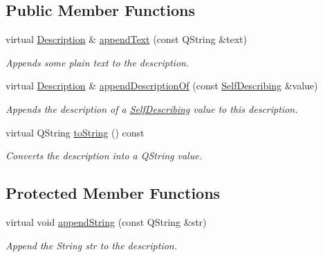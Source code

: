 \subsection*{Public Member Functions}
\begin{DoxyCompactItemize}
\item 
\hypertarget{class_hamcrest_qt_1_1_base_description_a31de838e1dc68a94d60488cacbf2f1f8}{virtual \hyperlink{class_hamcrest_qt_1_1_description}{Description} \& \hyperlink{class_hamcrest_qt_1_1_base_description_a31de838e1dc68a94d60488cacbf2f1f8}{append\-Text} (const Q\-String \&text)}\label{class_hamcrest_qt_1_1_base_description_a31de838e1dc68a94d60488cacbf2f1f8}

\begin{DoxyCompactList}\small\item\em Appends some plain text to the description. \end{DoxyCompactList}\item 
\hypertarget{class_hamcrest_qt_1_1_base_description_a7ee8f64ba57295fa47dbda5946c875a2}{virtual \hyperlink{class_hamcrest_qt_1_1_description}{Description} \& \hyperlink{class_hamcrest_qt_1_1_base_description_a7ee8f64ba57295fa47dbda5946c875a2}{append\-Description\-Of} (const \hyperlink{class_hamcrest_qt_1_1_self_describing}{Self\-Describing} \&value)}\label{class_hamcrest_qt_1_1_base_description_a7ee8f64ba57295fa47dbda5946c875a2}

\begin{DoxyCompactList}\small\item\em Appends the description of a \hyperlink{class_hamcrest_qt_1_1_self_describing}{Self\-Describing} value to this description. \end{DoxyCompactList}\item 
\hypertarget{class_hamcrest_qt_1_1_base_description_acbf4636e7be54e338de55b182acd6b8c}{virtual Q\-String \hyperlink{class_hamcrest_qt_1_1_base_description_acbf4636e7be54e338de55b182acd6b8c}{to\-String} () const }\label{class_hamcrest_qt_1_1_base_description_acbf4636e7be54e338de55b182acd6b8c}

\begin{DoxyCompactList}\small\item\em Converts the description into a {\ttfamily Q\-String} value. \end{DoxyCompactList}\end{DoxyCompactItemize}
\subsection*{Protected Member Functions}
\begin{DoxyCompactItemize}
\item 
virtual void \hyperlink{class_hamcrest_qt_1_1_base_description_a7bb209dee8a47c3b4346a8126d0f0b3c}{append\-String} (const Q\-String \&str)
\begin{DoxyCompactList}\small\item\em Append the String {\itshape str} to the description. \end{DoxyCompactList}\end{DoxyCompactItemize}
